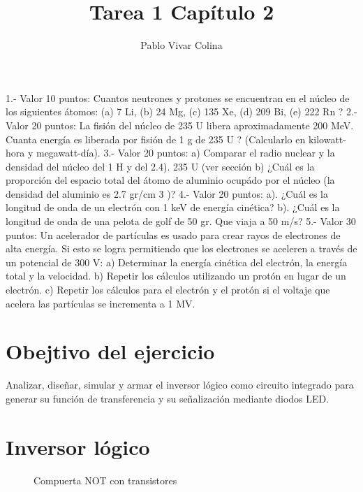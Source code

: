 \documentclass[]{article}
\title{Tarea 1 Capítulo 2}
\author{Pablo Vivar Colina}
\begin{document}
	

\maketitle




1.- Valor 10 puntos: Cuantos neutrones y protones se encuentran en el núcleo de los siguientes átomos:
(a) 7 Li,
(b) 24 Mg,
(c) 135 Xe,
(d) 209 Bi,
(e) 222 Rn ?
2.- Valor 20 puntos: La fisión del núcleo de 235 U libera aproximadamente 200 MeV. Cuanta energía es
liberada por fisión de 1 g de 235 U ? (Calcularlo en kilowatt-hora y megawatt-día).
3.- Valor 20 puntos: a) Comparar el radio nuclear y la densidad del núcleo del 1 H y del
2.4).
235
U (ver sección
b) ¿Cuál es la proporción del espacio total del átomo de aluminio ocupádo por el núcleo (la densidad del
aluminio es 2.7 gr/cm 3 )?
4.- Valor 20 puntos: a). ¿Cuál es la longitud de onda de un electrón con 1 keV de energía cinética?
b). ¿Cuál es la longitud de onda de una pelota de golf de 50 gr. Que viaja a 50 m/s?
5.- Valor 30 puntos: Un acelerador de partículas es usado para crear rayos de electrones de alta energía.
Si esto se logra permitiendo que los electrones se aceleren a través de un potencial de 300 V:
a) Determinar la energía cinética del electrón, la energía total y la velocidad.
b) Repetir los cálculos utilizando un protón en lugar de un electrón.
c) Repetir los cálculos para el electrón y el protón si el voltaje que acelera las partículas se incrementa a 1
MV.


\section{Obejtivo del ejercicio}

Analizar, diseñar, simular y armar el inversor lógico como circuito integrado para generar su función de transferencia y su señalización mediante diodos LED.


\section{Inversor lógico}


\begin{figure}[h!]
	\centering
	\caption{Compuerta NOT con transistores}
\end{figure}
\end{document}

